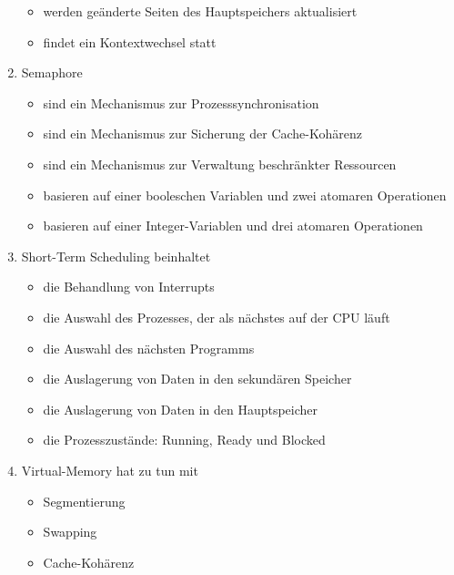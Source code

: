 \documentclass{exercisesheet}
\begin{document}
\begin{enumerate}
\begin{itemize}
          \item werden geänderte Seiten des Hauptspeichers aktualisiert
          \item findet ein Kontextwechsel statt \checkmark
        \end{itemize}
      \item Semaphore
        \begin{itemize}
          \item sind ein Mechanismus zur Prozesssynchronisation \checkmark
          \item sind ein Mechanismus zur Sicherung der Cache-Kohärenz
          \item sind ein Mechanismus zur Verwaltung beschränkter Ressourcen \checkmark
          \item basieren auf einer booleschen Variablen und zwei atomaren Operationen
          \item basieren auf einer Integer-Variablen und drei atomaren Operationen
        \end{itemize}
      \item Short-Term Scheduling beinhaltet
        \begin{itemize}
          \item die Behandlung von Interrupts \checkmark
          \item die Auswahl des Prozesses, der als nächstes auf der CPU läuft \checkmark
          \item die Auswahl des nächsten Programms
          \item die Auslagerung von Daten in den sekundären Speicher
          \item die Auslagerung von Daten in den Hauptspeicher
          \item die Prozesszustände: Running, Ready und Blocked \checkmark
        \end{itemize}
      \item Virtual-Memory hat zu tun mit
        \begin{itemize}
          \item Segmentierung \checkmark
          \item Swapping \checkmark
          \item Cache-Kohärenz
        \end{itemize}
    \end{enumerate}
\end{document}
